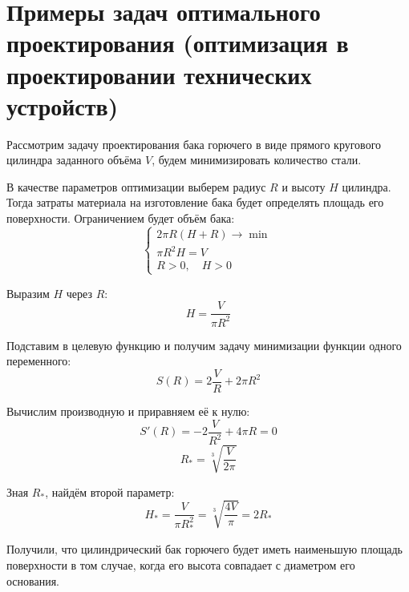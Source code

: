 \documentclass[17pt]{extarticle}
\begin{document}
\section{Примеры задач оптимального проектирования (оптимизация в проектировании технических устройств)}

Рассмотрим задачу проектирования бака горючего в виде прямого кругового цилиндра заданного объёма \( V \), будем минимизировать количество стали.

В качестве параметров оптимизации выберем радиус \( R \) и высоту \( H \) цилиндра. Тогда затраты материала на изготовление бака будет определять площадь его поверхности. Ограничением будет объём бака:
\[
    \begin{cases}
        2 \pi R (H + R) \to \min \\
        \pi R^2 H = V            \\
        R > 0, \quad H > 0
    \end{cases}
\]

Выразим \( H \) через \( R \):
\[
    H = \frac{V}{\pi R^2}
\]

Подставим в целевую функцию и получим задачу минимизации функции одного переменного:
\[
    S(R) = 2 \frac{V}{R} + 2 \pi R^2
\]

Вычислим производную и приравняем её к нулю:
\[
    S'(R) = -2 \frac{V}{R^2} + 4 \pi R = 0
\]
\[
    R_* = \sqrt[3]{\frac{V}{2 \pi}}
\]

Зная \( R_* \), найдём второй параметр:
\[
    H_* = \frac{V}{\pi R_*^2} = \sqrt[3]{\frac{4 V}{\pi}} = 2 R_*
\]

Получили, что цилиндрический бак горючего будет иметь наименьшую площадь поверхности в том случае, когда его высота совпадает с диаметром его основания.
\end{document}
